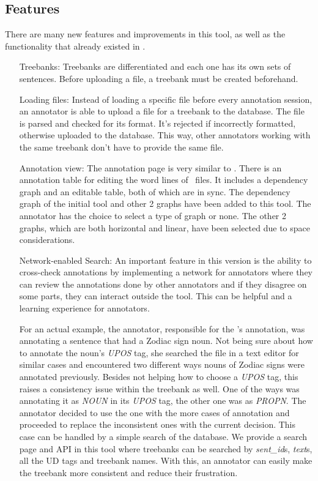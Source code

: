 \subsection{Features}
\label{sec:features}

There are many new features and improvements in this tool, as well as the functionality that already existed in \boatvone.

\begin{itemize}[before=\normalfont, font=\itshape, align=left]
\item[Treebanks:] Treebanks are differentiated and each one has its own sets of sentences.
Before uploading a \conllu{} file, a treebank must be created beforehand.

\item[Loading files:] Instead of loading a specific file before every annotation session, an annotator is able to upload a \conllu{} file for a treebank to the database.
The file is parsed and checked for its format. It's rejected if incorrectly formatted, otherwise uploaded to the database.
This way, other annotators working with the same treebank don't have to provide the same file.

\item[Annotation view:] The annotation page is very similar to \boatvone.
There is an annotation table for editing the word lines of \conllu\ files.
It includes a dependency graph and an editable table, both of which are in sync.
The dependency graph of the initial tool and other 2 graphs have been added to this tool.
The annotator has the choice to select a type of graph or none.
The other 2 graphs, which are both horizontal and linear, have been selected due to space considerations.

\item[Network-enabled Search:] An important feature in this version is the ability to cross-check annotations by implementing a network for annotators where they can review the annotations done by other annotators and if they disagree on some parts, they can interact outside the tool.
This can be helpful and a learning experience for annotators.

For an actual example, the annotator, responsible for the \bountreebank{}'s annotation, was annotating a sentence that had a Zodiac sign noun.
Not being sure about how to annotate the noun's \textit{UPOS} tag, she searched the \conllu{} file in a text editor for similar cases and encountered two different ways nouns of Zodiac signs were annotated previously.
Besides not helping how to choose a \textit{UPOS} tag, this raises a consistency issue within the treebank as well.
One of the ways was annotating it as \textit{NOUN} in its \textit{UPOS} tag, the other one was as \textit{PROPN}.
The annotator decided to use the one with the more cases of annotation and proceeded to replace the inconsistent ones with the current decision.
This case can be handled by a simple search of the database.
We provide a search page and API in this tool where treebanks can be searched by \textit{sent\_id}s, \textit{text}s, all the UD tags and treebank names.
With this, an annotator can easily make the treebank more consistent and reduce their frustration.


\end{itemize}

